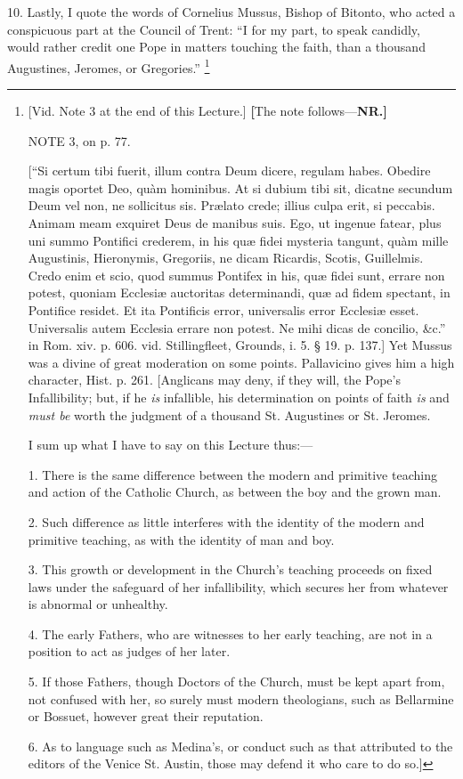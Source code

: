 10. Lastly, I quote the words of Cornelius Mussus, Bishop of
Bitonto, who acted a conspicuous part at the Council of Trent: ``I
for my part, to speak candidly, would rather credit one Pope in
matters touching the faith, than a thousand Augustines, Jeromes, or
Gregories.'' \footnote{[Vid. Note 3 at the end of this Lecture.] \textbf{[}The note follows—\textbf{NR.}\textbf{]}

NOTE
3, on p. 77.

[``Si certum tibi fuerit, illum contra Deum
dicere, regulam habes. Obedire magis oportet Deo, quàm hominibus. At
si dubium tibi sit, dicatne secundum Deum vel non, ne sollicitus sis.
Prælato crede; illius culpa erit, si peccabis. Animam meam exquiret
Deus de manibus suis. Ego, ut ingenue fatear, plus uni summo Pontifici
crederem, in his quæ fidei mysteria tangunt, quàm mille Augustinis,
Hieronymis, Gregoriis, ne dicam Ricardis, Scotis, Guillelmis. Credo
enim et scio, quod summus Pontifex in his, quæ fidei sunt, errare non
potest, quoniam Ecclesiæ auctoritas determinandi, quæ ad fidem
spectant, in Pontifice residet. Et ita Pontificis error, universalis
error Ecclesiæ esset. Universalis autem Ecclesia errare non potest.
Ne mihi dicas de concilio, \&c.'' in Rom. xiv. p. 606. vid.
Stillingfleet, Grounds, i. 5. § 19. p. 137.] Yet Mussus was a divine
of great moderation on some points. Pallavicino gives him a high
character, Hist. p. 261. [Anglicans may deny, if they will, the Pope's
Infallibility; but, if he \emph{is} infallible, his determination on
points of faith \emph{is} and \emph{must be} worth the judgment of a thousand
St. Augustines or St. Jeromes.

I sum up what I have to say on this Lecture thus:—

1. There is the same difference between the modern
and primitive teaching and action of the Catholic Church, as between
the boy and the grown man.

2. Such difference as little interferes with the
identity of the modern and primitive teaching, as with the identity of
man and boy.

3. This growth or development in the Church's
teaching proceeds on fixed laws under the safeguard of her
infallibility, which secures her from whatever is abnormal or
unhealthy.

4. The early Fathers, who are witnesses to her early
teaching, are not in a position to act as judges of her later.

5. If those Fathers, though Doctors of the Church,
must be kept apart from, not confused with her, so surely must modern
theologians, such as Bellarmine or Bossuet, however great their
reputation.

6. As to language such as Medina's, or conduct such
as that attributed to the editors of the Venice St. Austin, those may
defend it who care to do so.]}


